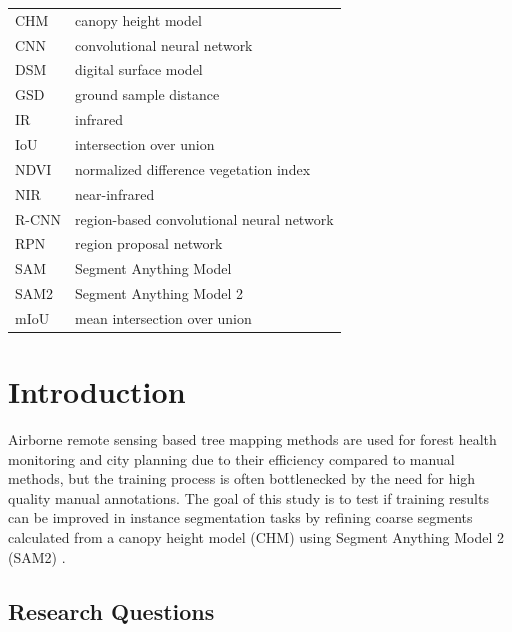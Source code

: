 \documentclass[english, 12pt, a4paper, sci, utf8, a-2b, online]{aaltothesis}
\begin{document}


\begin{tabular}{ll}
CHM & canopy height model \\
CNN & convolutional neural network \\
DSM & digital surface model \\
GSD & ground sample distance \\
IR & infrared \\
IoU & intersection over union \\
NDVI & normalized difference vegetation index \\
NIR & near-infrared \\
R-CNN & region-based convolutional neural network \\
RPN & region proposal network \\
SAM & Segment Anything Model \\
SAM2 & Segment Anything Model 2 \\
mIoU & mean intersection over union \\
\end{tabular}

\cleardoublepage

\section{Introduction}
\label{sec:intro}

\thispagestyle{empty}

Airborne remote sensing based tree mapping methods are used for forest health monitoring \cite{ecke} and city planning \cite{velasquez} due to their efficiency compared to manual methods, but the training process is often bottlenecked by the need for high quality manual annotations. 
The goal of this study is to test if training results can be improved in instance segmentation tasks by refining coarse segments calculated from a canopy height model (CHM) using Segment Anything Model 2 (SAM2) \cite{sam2}.

\subsection{Research Questions}
\end{document}
